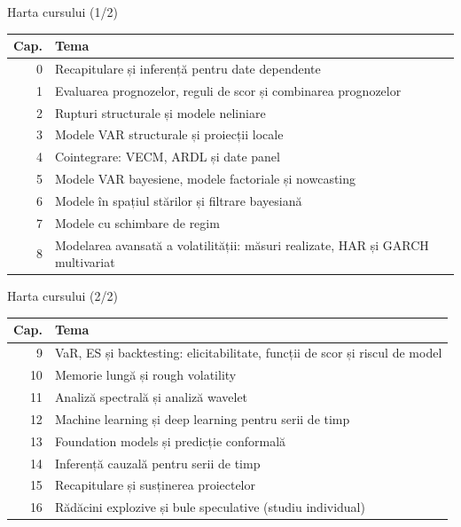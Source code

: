 \begin{frame}{Harta cursului (1/2)}
\begin{center}
\footnotesize
\begin{tabular}{rl}
\toprule
\textbf{Cap.} & \textbf{Tema} \\
\midrule
0 & Recapitulare și inferență pentru date dependente \\
1 & Evaluarea prognozelor, reguli de scor și combinarea prognozelor \\
2 & Rupturi structurale și modele neliniare \\
3 & Modele VAR structurale și proiecții locale \\
4 & Cointegrare: VECM, ARDL și date panel \\
5 & Modele VAR bayesiene, modele factoriale și nowcasting \\
6 & Modele în spațiul stărilor și filtrare bayesiană \\
7 & Modele cu schimbare de regim \\
8 & Modelarea avansată a volatilității: măsuri realizate, HAR și GARCH multivariat \\
\bottomrule
\end{tabular}
\end{center}
\end{frame}

\begin{frame}{Harta cursului (2/2)}
\begin{center}
\footnotesize
\begin{tabular}{rl}
\toprule
\textbf{Cap.} & \textbf{Tema} \\
\midrule
9 & VaR, ES și backtesting: elicitabilitate, funcții de scor și riscul de model \\
10 & Memorie lungă și rough volatility \\
11 & Analiză spectrală și analiză wavelet \\
12 & Machine learning și deep learning pentru serii de timp \\
13 & Foundation models și predicție conformală \\
14 & Inferență cauzală pentru serii de timp \\
15 & Recapitulare și susținerea proiectelor \\
16 & Rădăcini explozive și bule speculative (studiu individual) \\
\bottomrule
\end{tabular}
\end{center}
\end{frame}

